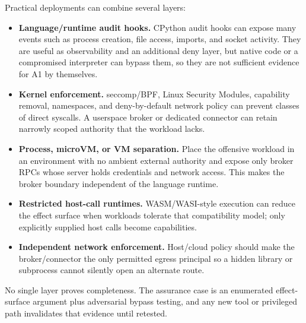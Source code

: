 \documentclass[11pt,letterpaper]{article}
\begin{document}
Practical deployments can combine several layers:
\begin{itemize}
  \item \textbf{Language/runtime audit hooks.} CPython audit hooks can expose many events such as process creation, file access, imports, and socket activity. They are useful as observability and an additional deny layer, but native code or a compromised interpreter can bypass them, so they are not sufficient evidence for A1 by themselves.
  \item \textbf{Kernel enforcement.} seccomp/BPF, Linux Security Modules, capability removal, namespaces, and deny-by-default network policy can prevent classes of direct syscalls. A userspace broker or dedicated connector can retain narrowly scoped authority that the workload lacks.
  \item \textbf{Process, microVM, or VM separation.} Place the offensive workload in an environment with no ambient external authority and expose only broker RPCs whose server holds credentials and network access. This makes the broker boundary independent of the language runtime.
  \item \textbf{Restricted host-call runtimes.} WASM/WASI-style execution can reduce the effect surface when workloads tolerate that compatibility model; only explicitly supplied host calls become capabilities.
  \item \textbf{Independent network enforcement.} Host/cloud policy should make the broker/connector the only permitted egress principal so a hidden library or subprocess cannot silently open an alternate route.
\end{itemize}
No single layer proves completeness. The assurance case is an enumerated effect-surface argument plus adversarial bypass testing, and any new tool or privileged path invalidates that evidence until retested.
\end{document}
